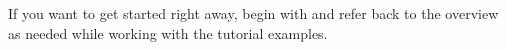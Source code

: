 
If you want to get started right away, begin with 
and refer back to the overview as needed while working with the tutorial
examples.

\endinput
